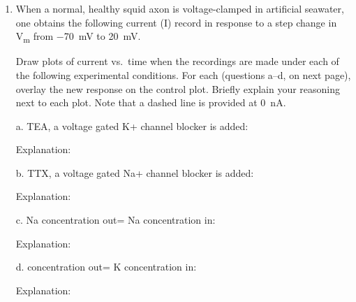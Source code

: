 \documentclass[plain,worksheet]{inVerba-notes}
\begin{document}
\begin{enumerate}[resume]
    \item When a normal, healthy squid axon is voltage-clamped in artificial seawater, one obtains the following current (I) record in response to a step change in \si{V_m} from \SI{-70}{mV} to \SI{+20}{mV}.
    
    \bigskip
    \bigskip
    \begin{center}
        
    \end{center}

    Draw plots of current vs.\ time when the recordings are made under each of the following experimental conditions. For each (questions a--d, on next page), overlay the new response on the control plot. Briefly explain your reasoning next to each plot. Note that a dashed line is provided at \SI{0}{nA}. 
    
    \newpage
    \item[a.] TEA, a voltage gated K+ channel blocker is added:
    
    \bigskip
    \bigskip
    \begin{center}
        
    \end{center}

    Explanation:
    \vspace{80pt}

    \item[b.] TTX, a voltage gated Na+ channel blocker is added:
    
    \bigskip
    \bigskip
    \begin{center}
        
    \end{center}
    
    Explanation:
    \vspace{80pt}

    \newpage
    \item[c.] Na concentration out= Na concentration in:
    
    \bigskip
    \bigskip
    \begin{center}
        
    \end{center}
    
    Explanation:
    \vspace{80pt}

    \item[d.]  concentration out= K concentration in:

    \bigskip
    \bigskip
    \begin{center}
        
    \end{center}
    
    Explanation:
    \vspace{80pt}
\end{enumerate}
\end{document}
